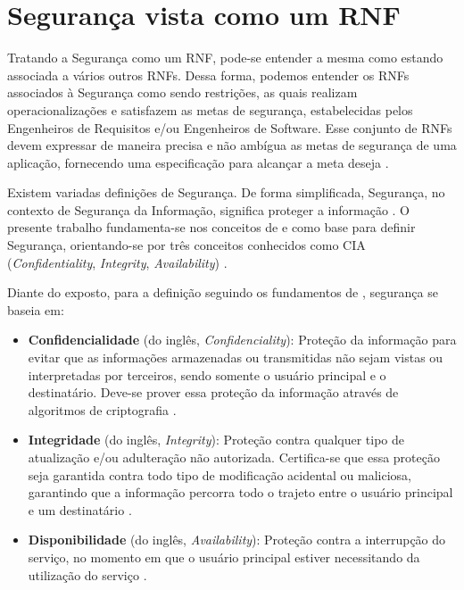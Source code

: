 \section{Segurança vista como um RNF}
\label{sec:seguranca}

Tratando a Segurança como um RNF, pode-se entender a mesma como estando associada a vários outros RNFs. Dessa forma, podemos entender os RNFs associados à Segurança como sendo restrições, as quais realizam operacionalizações e satisfazem as metas de segurança, estabelecidas pelos Engenheiros de Requisitos e/ou Engenheiros de Software. Esse conjunto de  RNFs devem expressar de maneira precisa e não ambígua as metas de segurança de uma aplicação, fornecendo uma especificação para alcançar a meta deseja \cite{haley2006framework}.  

Existem variadas definições de Segurança. De forma simplificada, Segurança, no contexto de Segurança da Informação, significa proteger a informação \cite{chung2012non}. O presente trabalho fundamenta-se nos conceitos de \cite{chung2012non} e \cite{sullivan2011web} como base para definir Segurança, orientando-se por três conceitos conhecidos como CIA (\textit{Confidentiality}, \textit{Integrity}, \textit{Availability}) . 

Diante do exposto, para a definição seguindo os fundamentos de \cite{chung2012non}, segurança se baseia em: 

\begin{itemize}
	\item \textbf{Confidencialidade} (do inglês, \textit{Confidenciality}): Proteção da informação para evitar que as informações armazenadas ou transmitidas não sejam vistas ou interpretadas por terceiros, sendo somente o usuário principal e o destinatário. Deve-se prover essa proteção da informação através de algoritmos de criptografia \cite{chung2012non} \cite{silva2007arquitetura}. 
	
	\item \textbf{Integridade} (do inglês, \textit{Integrity}): Proteção contra qualquer tipo de atualização e/ou adulteração não autorizada. Certifica-se que essa proteção seja garantida contra todo tipo de modificação acidental ou maliciosa, garantindo que a informação percorra todo o trajeto entre o usuário principal e um destinatário \cite{chung2012non} \cite{silva2007arquitetura}. 
	
	\item \textbf{Disponibilidade} (do inglês, \textit{Availability}): Proteção contra a interrupção do serviço, no momento em que o usuário principal estiver necessitando da utilização do serviço \cite{chung2012non} \cite{silva2007arquitetura}.
	  
\end{itemize}


